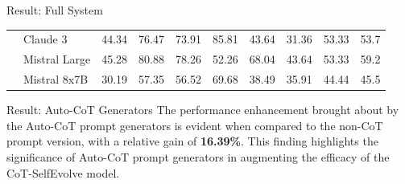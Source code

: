 \begin{frame}{Result: Full System}
\begin{table}[H]
{\begin{tabular}{|l|l|c|c|c|c|c|c|c|c|}
                                                & Claude 3      & 44.34                      & 76.47                        & 73.91                        & 85.81                           & 43.64                       & 31.36                      & 53.33                           & 53.7                         \\ \cline{2-10}
                                                & Mistral Large & 45.28                      & 80.88                        & 78.26                        & 52.26                           & 68.04                       & 43.64                      & 53.33                           & 59.2                         \\ \cline{2-10}
                                                & Mistral 8x7B  & 30.19                      & 57.35                        & 56.52                        & 69.68                           & 38.49                       & 35.91                      & 44.44                           & 45.5                         \\ \hline
            \end{tabular}%
        }
    \end{table}
\end{frame}

\begin{frame}{Result: Auto-CoT Generators}
    The performance enhancement brought about by the Auto-CoT prompt generators is evident when compared to the non-CoT prompt version, with a relative gain of \textbf{16.39\%}. This finding highlights the significance of Auto-CoT prompt generators in augmenting the efficacy of the CoT-SelfEvolve model.

    \begin{table}[H]
        \caption*{$\text{Pass@5}$ results on the DS-1000 dataset w or w/o CoT prompts. (\%)}
    \end{table}
\end{frame}

